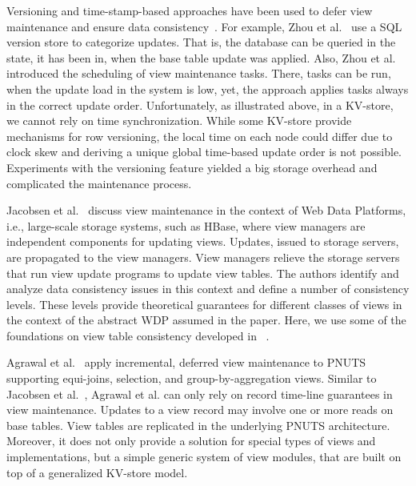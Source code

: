 Versioning and time-stamp-based approaches have been used to defer view 
maintenance and ensure data consistency~\cite{salem:how, zhou:lazy}. For 
example, Zhou et al.~\cite{zhou:lazy} use a SQL version store to 
categorize updates. That is, the database can be queried in the state, 
it has been in, when the base table update was applied. Also, Zhou et 
al.~\cite{zhou:lazy} introduced the scheduling of view maintenance 
tasks. There, tasks can be run, when the update load in the system is 
low, yet, the approach applies tasks always in the correct update order. 
Unfortunately, as illustrated above, in a KV-store, we cannot rely on 
time synchronization. While some KV-store provide mechanisms for row 
versioning, the local time on each node could differ due to clock skew 
and deriving a unique global time-based update order is not possible. 
Experiments with the versioning feature yielded a big storage overhead 
and complicated the maintenance process. 

Jacobsen et al.~\cite{jacobsen:viewmaintenance} discuss view maintenance 
in the context of Web Data Platforms, i.e., large-scale storage systems, 
such as HBase, where view managers are independent components for 
updating views. Updates, issued to storage servers, are propagated to 
the view managers. View managers relieve the storage servers that run 
view update programs to update view tables. The authors identify and 
analyze data consistency issues in this context and define a number of 
consistency levels. These levels provide theoretical guarantees for 
different classes of views in the context of the abstract WDP assumed in 
the paper. Here, we use some of the foundations on view table 
consistency developed in ~\cite{jacobsen:viewmaintenance}. 

Agrawal et al.~\cite{agrawal:asynchronous} apply incremental, deferred 
view maintenance to PNUTS~\cite{cooper:pnuts} supporting equi-joins, 
selection, and group-by-aggregation views. Similar to Jacobsen et 
al.~\cite{jacobsen:viewmaintenance}, Agrawal et al. can only rely on 
record time-line guarantees in view maintenance. Updates to a view 
record may involve one or more reads on base tables. View tables are 
replicated in the underlying PNUTS architecture. Moreover, it does not 
only provide a solution for special types of views and implementations, 
but a simple generic system of view modules, that are built on top of 
a generalized KV-store model. 





